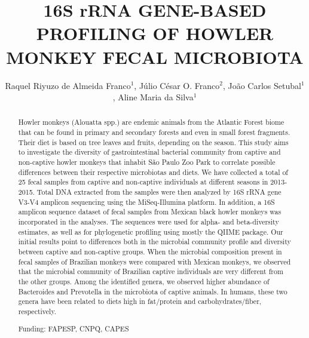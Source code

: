 \documentclass[twoside]{article}
\title{\vspace{-15mm}\fontsize{24pt}{10pt}\selectfont\textbf{16S rRNA GENE-BASED PROFILING OF HOWLER MONKEY FECAL MICROBIOTA}} %
\author{Raquel Riyuzo de Almeida Franco$^1$, J\'ulio C\'esar O. Franco$^2$, Jo\~ao Carlos Setubal$^1$, Aline Maria da Silva$^1$}
\affil{1 USP\\ 2 UNIFESP\\ }
\date{}
\begin{document}
\maketitle %

\thispagestyle{fancy} %


\begin{abstract}
Howler monkeys (Alouatta spp.) are endemic animals from the Atlantic Forest biome that can be found in primary and secondary forests and even in small forest fragments. Their diet is based on tree leaves and fruits, depending on the season. This study aims to investigate the diversity of gastrointestinal bacterial community from captive and non-captive howler monkeys that inhabit S\~ao Paulo Zoo Park to correlate possible differences between their respective microbiotas and diets. We have collected a total of 25 fecal samples from captive and non-captive individuals at different seasons in 2013-2015. Total DNA extracted from the samples were then analyzed by 16S rRNA gene V3-V4 amplicon sequencing using the MiSeq-Illumina platform. In addition, a 16S amplicon sequence dataset of fecal samples from Mexican black howler monkeys was incorporated in the analyses. The sequences were used for alpha- and beta-diversity estimates, as well as for phylogenetic profiling using mostly the QIIME package. Our initial results point to differences both in the microbial community profile and diversity between captive and non-captive groups. When the microbial composition present in fecal samples of Brazilian monkeys were compared with Mexican monkeys, we observed that the microbial community of Brazilian captive individuals are very different from the other groups. Among the identified genera, we observed higher abundance of Bacteroides and Prevotella in the microbiota of captive animals. In humans, these two genera have been related to diets high in fat/protein and carbohydrates/fiber, respectively.

Funding: FAPESP, CNPQ, CAPES
\end{abstract}
\end{document}
